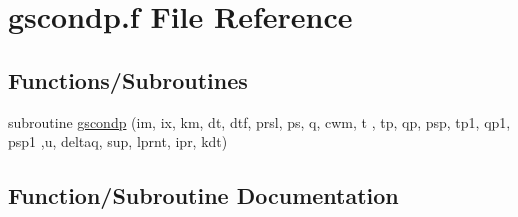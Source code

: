 \hypertarget{gscondp_8f}{}\section{gscondp.\+f File Reference}
\label{gscondp_8f}
\subsection*{Functions/\+Subroutines}
\begin{DoxyCompactItemize}
\item 
subroutine \hyperlink{gscondp_8f_a604b82ae595aa7783efaa32cfde39e98}{gscondp} (im, ix, km, dt, dtf, prsl, ps, q, cwm, t               ,                                                               tp, qp, psp, tp1, qp1, psp1                   ,u, deltaq, sup, lprnt, ipr, kdt)
\end{DoxyCompactItemize}


\subsection{Function/\+Subroutine Documentation}
